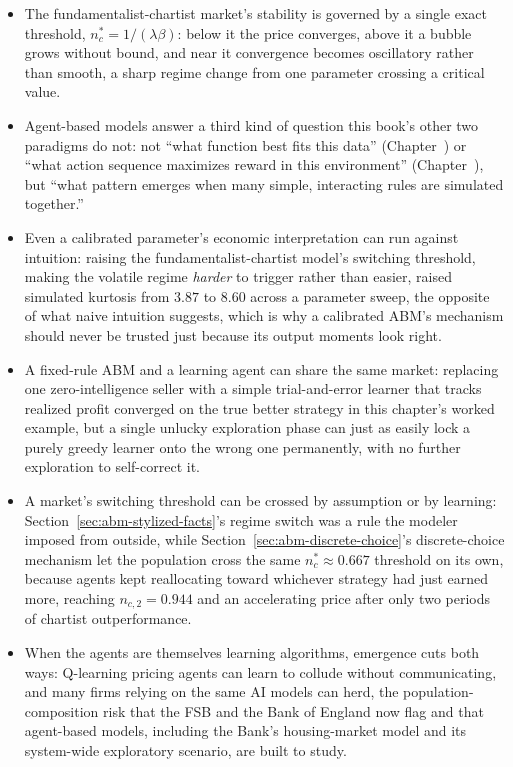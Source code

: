 \documentclass[../ai_in_finance]{subfiles}
\begin{document}
\begin{itemize}
    \item The fundamentalist-chartist market's stability is governed by a single exact threshold, $n_c^{*}=1/(\lambda\beta)$: below it the price converges, above it a bubble grows without bound, and near it convergence becomes oscillatory rather than smooth, a sharp regime change from one parameter crossing a critical value.
    \item Agent-based models answer a third kind of question this book's other two paradigms do not: not ``what function best fits this data'' (Chapter~) or ``what action sequence maximizes reward in this environment'' (Chapter~), but ``what pattern emerges when many simple, interacting rules are simulated together.''
    \item Even a calibrated parameter's economic interpretation can run against intuition: raising the fundamentalist-chartist model's switching threshold, making the volatile regime \emph{harder} to trigger rather than easier, raised simulated kurtosis from $3.87$ to $8.60$ across a parameter sweep, the opposite of what naive intuition suggests, which is why a calibrated ABM's mechanism should never be trusted just because its output moments look right.
    \item A fixed-rule ABM and a learning agent can share the same market: replacing one zero-intelligence seller with a simple trial-and-error learner that tracks realized profit converged on the true better strategy in this chapter's worked example, but a single unlucky exploration phase can just as easily lock a purely greedy learner onto the wrong one permanently, with no further exploration to self-correct it.
    \item A market's switching threshold can be crossed by assumption or by learning: Section~\ref{sec:abm-stylized-facts}'s regime switch was a rule the modeler imposed from outside, while Section~\ref{sec:abm-discrete-choice}'s discrete-choice mechanism let the population cross the same $n_c^{*}\approx0.667$ threshold on its own, because agents kept reallocating toward whichever strategy had just earned more, reaching $n_{c,2}=0.944$ and an accelerating price after only two periods of chartist outperformance.
    \item When the agents are themselves learning algorithms, emergence cuts both ways: Q-learning pricing agents can learn to collude without communicating, and many firms relying on the same AI models can herd, the population-composition risk that the FSB and the Bank of England now flag and that agent-based models, including the Bank's housing-market model and its system-wide exploratory scenario, are built to study.
\end{itemize}
\end{document}
